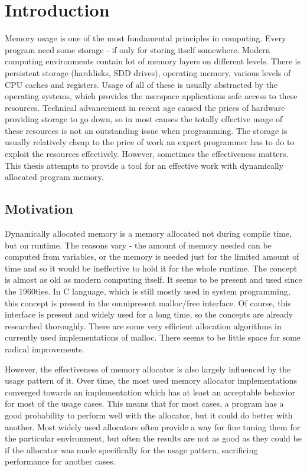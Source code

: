 
\chapter{Introduction}
Memory usage is one of the most fundamental principles in computing. Every program need some storage - if only for storing itself somewhere. Modern computing environments contain lot of memory layers on different levels. There is persistent storage (harddisks, SDD drives), operating memory, various levels of CPU caches and registers. Usage of all of these is usually abstracted by the operating systems, which provides the userspace applications safe access to these resources. Technical advancement in recent age caused the prices of hardware providing storage to go down, so in most causes the totally effective usage of these resources is not an outstanding issue when programming. The storage is usually relatively cheap to the price of work an expert programmer has to do to exploit the resources effectively. However, sometimes the effectiveness matters. This thesis attempts to provide a tool for an effective work with dynamically allocated program memory.
\section{Motivation} 
Dynamically allocated memory is a memory allocated not during compile time, but on runtime. The reasons vary - the amount of memory needed can be computed from variables, or the memory is needed just for the limited amount of time and so it would be ineffective to hold it for the whole runtime. The concept is almost as old as modern computing itself. It seems to be present and used since the 1960ties. In C language, which is still mostly used in system programming, this concept is present in the omnipresent malloc/free interface. Of course, this interface is present and widely used for a long time, so the concepts are already researched thoroughly. There are some very efficient allocation algorithms in currently used implementations of malloc. There seems to be little space for some radical improvements.

However, the effectiveness of memory allocator is also largely influenced by the usage pattern of it. Over time, the most used memory allocator implementations converged towards an implementation which has at least an acceptable behavior for most of the usage cases. This means that for most cases, a program has a good probability to perform well with the allocator, but it could do better with another. Most widely used allocators often provide a way for fine tuning them for the particular environment, but often the results are not as good as they could be if the allocator was made specifically for the usage pattern, sacrificing performance for another cases.

